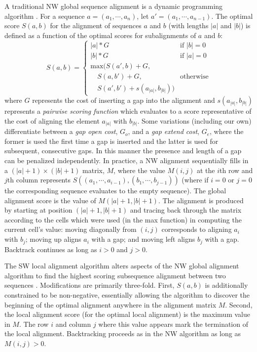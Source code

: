 \documentclass[phd,electronic,oneside,twosidetoc,letterpaper,chaptercenter,parttop,lol,lof,lot]{byumsphd}
\begin{document}
A traditional NW global sequence alignment is a dynamic programming algorithm \cite{needleman1970general}. For a sequence $a = (a_1,\cdots,a_n)$, let $a'=(a_1,\cdots,a_{n-1})$. The optimal score $S(a,b)$ for the alignment of sequences $a$ and $b$ (with lengths $|a|$ and $|b|$) is defined as a function of the optimal scores for subalignments of $a$ and $b$:
\[
S(a,b) =
\begin{cases}
|a| * G & \text{if } |b| = 0 \\
|b| * G & \text{if } |a| = 0 \\
\text{max}(S(a',b) + G, \\
\quad S(a,b') + G, & \text{otherwise} \\
\quad S(a',b') + s(a_{|a|},b_{|b|}))
\end{cases}
\]
\noindent where $G$ represents the cost of inserting a gap into the alignment and $s(a_{|a|},b_{|b|})$ represents a \textit{pairwise scoring function} which evaluates to a score representative of the cost of aligning the element $a_{|a|}$ with $b_{|b|}$. Some variations (including our own) differentiate between a \textit{gap open cost}, $G_o$, and a \textit{gap extend cost}, $G_e$, where the former is used the first time a gap is inserted and the latter is used for subsequent, consecutive gaps. In this manner the presence and length of a gap can be penalized independently. In practice, a NW alignment sequentially fills in a $(|a|+1)\times(|b|+1)$ matrix, $M$, where the value $M(i,j)$ at the $i$th row and $j$th column represents $S((a_1,\cdots,a_{i-1}),(b_1,\cdots,b_{j-1}))$ (where if $i=0$ or $j=0$ the corresponding sequence evaluates to the empty sequence). The global alignment score is the value of $M(|a|+1,|b|+1)$. The alignment is produced by starting at position $(|a|+1,|b|+1)$ and tracing back through the matrix according to the cells which were used (in the max function) in computing the current cell's value: moving diagonally from $(i,j)$ corresponds to aligning $a_i$ with $b_j$; moving up aligns $a_i$ with a gap; and moving left aligns $b_j$ with a gap. Backtrack continues as long as $i>0$ and $j>0$. 

The SW local alignment algorithm alters aspects of the NW global alignment algorithm to find the highest scoring subsequence alignment between two sequences \cite{smith1981identification}. Modifications are primarily three-fold. First, $S(a,b)$ is additionally constrained to be non-negative, essentially allowing the algorithm to discover the beginning of the optimal alignment anywhere in the alignment matrix $M$. Second, the local alignment score (for the optimal local alignment) is the maximum value in $M$. The row $i$ and column $j$ where this value appears mark the termination of the local alignment. Backtracking proceeds as in the NW algorithm as long as $M(i,j) > 0$.
\end{document}
